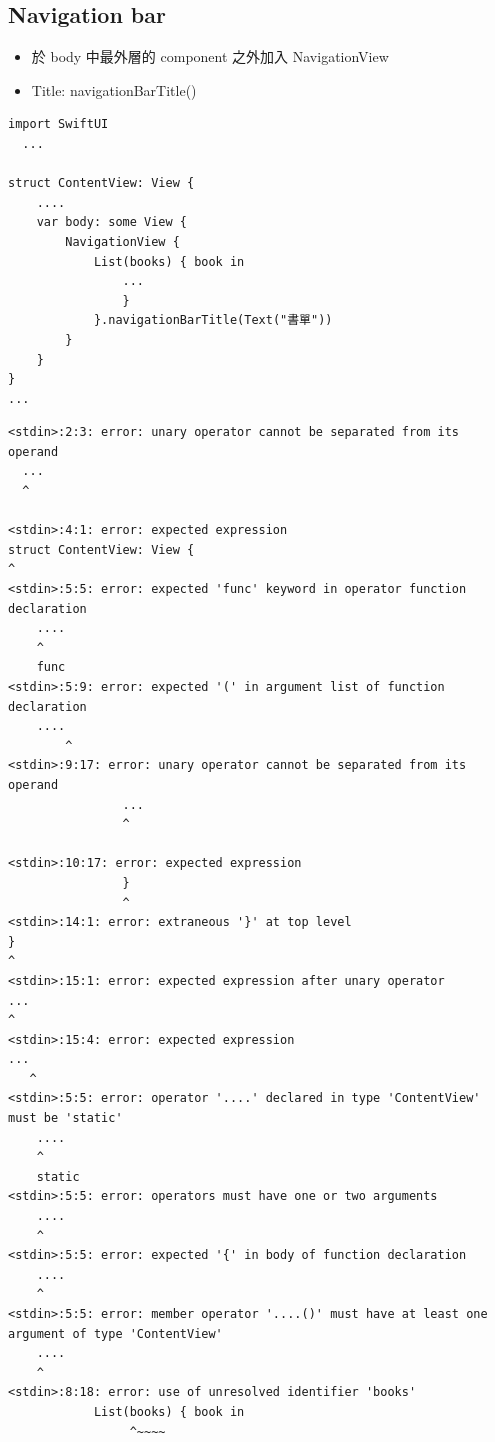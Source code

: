 \documentclass[a4paper,12pt]{article}
\begin{document}
\subsection{Navigation bar}
\label{sec:org0ff3f7e}
\begin{itemize}
\item 於 body 中最外層的 component 之外加入 NavigationView\\
\item Title: navigationBarTitle()\\
\end{itemize}
\lstset{breaklines=true,language=swift,label= ,caption= ,captionpos=b,firstnumber=1,numbers=left}
\begin{lstlisting}
import SwiftUI
  ...

struct ContentView: View {
    ....
    var body: some View {
        NavigationView {
            List(books) { book in
                ...
                }
            }.navigationBarTitle(Text("書單"))
        }
    }
}
...
\end{lstlisting}

\begin{verbatim}
<stdin>:2:3: error: unary operator cannot be separated from its operand
  ...
  ^
     
<stdin>:4:1: error: expected expression
struct ContentView: View {
^
<stdin>:5:5: error: expected 'func' keyword in operator function declaration
    ....
    ^
    func 
<stdin>:5:9: error: expected '(' in argument list of function declaration
    ....
        ^
<stdin>:9:17: error: unary operator cannot be separated from its operand
                ...
                ^
                   
<stdin>:10:17: error: expected expression
                }
                ^
<stdin>:14:1: error: extraneous '}' at top level
}
^
<stdin>:15:1: error: expected expression after unary operator
...
^
<stdin>:15:4: error: expected expression
...
   ^
<stdin>:5:5: error: operator '....' declared in type 'ContentView' must be 'static'
    ....
    ^
    static 
<stdin>:5:5: error: operators must have one or two arguments
    ....
    ^
<stdin>:5:5: error: expected '{' in body of function declaration
    ....
    ^
<stdin>:5:5: error: member operator '....()' must have at least one argument of type 'ContentView'
    ....
    ^
<stdin>:8:18: error: use of unresolved identifier 'books'
            List(books) { book in
                 ^~~~~
\end{verbatim}
\end{document}
